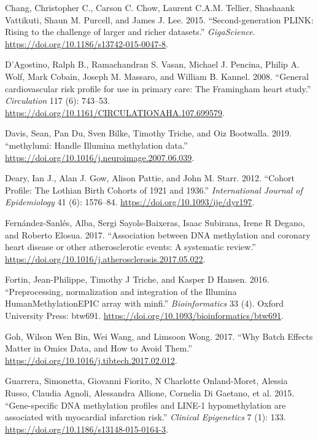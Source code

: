 \documentclass[]{article}
\begin{document}
\leavevmode\hypertarget{ref-Chang2015}{}%
Chang, Christopher C., Carson C. Chow, Laurent C.A.M. Tellier, Shashaank
Vattikuti, Shaun M. Purcell, and James J. Lee. 2015. ``Second-generation
PLINK: Rising to the challenge of larger and richer datasets.''
\emph{GigaScience}. \url{https://doi.org/10.1186/s13742-015-0047-8}.

\leavevmode\hypertarget{ref-DAgostino2008}{}%
D'Agostino, Ralph B., Ramachandran S. Vasan, Michael J. Pencina, Philip
A. Wolf, Mark Cobain, Joseph M. Massaro, and William B. Kannel. 2008.
``General cardiovascular risk profile for use in primary care: The
Framingham heart study.'' \emph{Circulation} 117 (6): 743--53.
\url{https://doi.org/10.1161/CIRCULATIONAHA.107.699579}.

\leavevmode\hypertarget{ref-Davis2019}{}%
Davis, Sean, Pan Du, Sven Bilke, Timothy Triche, and Oiz Bootwalla.
2019. ``methylumi: Handle Illumina methylation data.''
\url{https://doi.org/10.1016/j.neuroimage.2007.06.039}.

\leavevmode\hypertarget{ref-Deary2012}{}%
Deary, Ian J., Alan J. Gow, Alison Pattie, and John M. Starr. 2012.
``Cohort Profile: The Lothian Birth Cohorts of 1921 and 1936.''
\emph{International Journal of Epidemiology} 41 (6): 1576--84.
\url{https://doi.org/10.1093/ije/dyr197}.

\leavevmode\hypertarget{ref-Fernandez-Sanles2017}{}%
Fernández-Sanlés, Alba, Sergi Sayols-Baixeras, Isaac Subirana, Irene R
Degano, and Roberto Elosua. 2017. ``Association between DNA methylation
and coronary heart disease or other atherosclerotic events: A systematic
review.'' \url{https://doi.org/10.1016/j.atherosclerosis.2017.05.022}.

\leavevmode\hypertarget{ref-Fortin2016}{}%
Fortin, Jean-Philippe, Timothy J Triche, and Kasper D Hansen. 2016.
``Preprocessing, normalization and integration of the Illumina
HumanMethylationEPIC array with minfi.'' \emph{Bioinformatics} 33 (4).
Oxford University Press: btw691.
\url{https://doi.org/10.1093/bioinformatics/btw691}.

\leavevmode\hypertarget{ref-Goh2017}{}%
Goh, Wilson Wen Bin, Wei Wang, and Limsoon Wong. 2017. ``Why Batch
Effects Matter in Omics Data, and How to Avoid Them.''
\url{https://doi.org/10.1016/j.tibtech.2017.02.012}.

\leavevmode\hypertarget{ref-Guarrera2015}{}%
Guarrera, Simonetta, Giovanni Fiorito, N Charlotte Onland-Moret, Alessia
Russo, Claudia Agnoli, Alessandra Allione, Cornelia Di Gaetano, et al.
2015. ``Gene-specific DNA methylation profiles and LINE-1
hypomethylation are associated with myocardial infarction risk.''
\emph{Clinical Epigenetics} 7 (1): 133.
\url{https://doi.org/10.1186/s13148-015-0164-3}.
\end{document}
